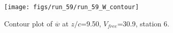 \begin{figure}[H]
\centering
\texttt{[image: figs/run\_59/run\_59\_W\_contour]}
\caption{Contour plot of $\overline{w}$ at $z/c$=9.50, $V_{free}$=30.9, station 6.}
\label{fig:run_59_W_contour}
\end{figure}


